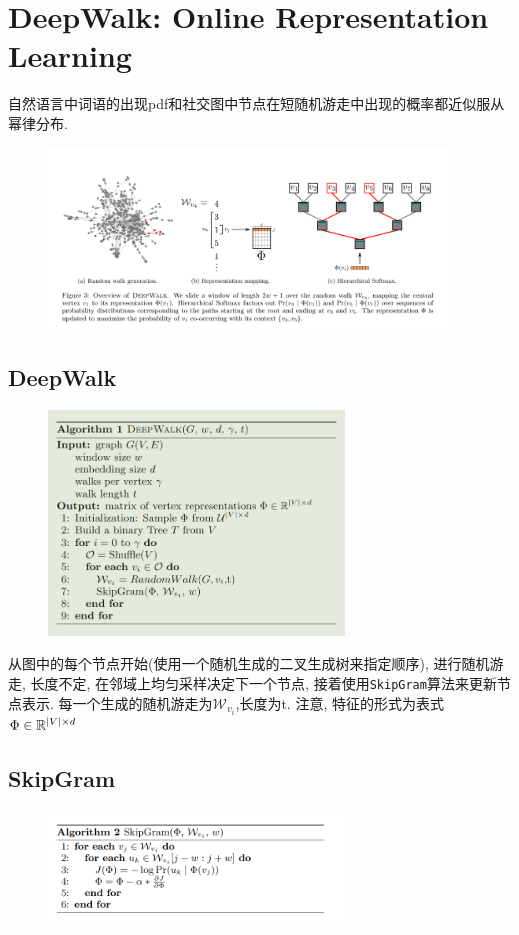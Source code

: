 \documentclass{article}
\begin{document}
\section{DeepWalk: Online Representation Learning}

 自然语言中词语的出现pdf和社交图中节点在短随机游走中出现的概率都近似服从幂律分布.

\begin{figure}[htbp]
    \centering
    \includegraphics[width=0.95\textwidth]{deepwalk-overview.png}
\end{figure}

\subsection{DeepWalk}
\begin{figure}[htbp]
    \centering
    \includegraphics[width=0.7\textwidth]{deepwalk-deepwalk.png}
\end{figure}

从图中的每个节点开始(使用一个随机生成的二叉生成树来指定顺序), 进行随机游走, 长度不定, 在邻域上均匀采样决定下一个节点, 接着使用\verb|SkipGram|算法来更新节点表示. 每一个生成的随机游走为$\mathcal{W}_{v_i}$,长度为t. 注意, 特征的形式为表式$\Phi\in \mathbb{R}^{|V|\times d}$

\subsection{SkipGram}
\begin{figure}[htbp]
    \centering
    \includegraphics[width=0.7\textwidth]{deepwalk-skipgram.png}
\end{figure}
\end{document}
